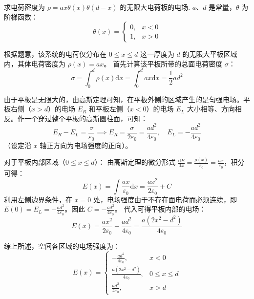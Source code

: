 \begin{exercise}\label{ex:15.10}
求电荷密度为 $\rho = ax\theta(x)\theta(d-x)$ 的无限大电荷板的电场. $a$、$d$ 是常量，$\theta$ 为阶梯函数：
$$ \theta(x) = \begin{cases} 0, & x < 0 \\ 1, & x > 0 \end{cases} $$
\end{exercise}
\begin{solution}
根据题意，该系统的电荷仅分布在 $0 \le x \le d$ 这一厚度为 $d$ 的无限大平板区域内，其体电荷密度为 $\rho(x) = ax$。
首先计算该平板所带的总面电荷密度 $\sigma$：
$$ \sigma = \int_0^d \rho(x) \mathrm{d}x = \int_0^d ax \mathrm{d}x = \frac{1}{2}ad^2 $$

由于平板是无限大的，由高斯定理可知，在平板外侧的区域产生的是匀强电场。平板右侧（$x > d$）的电场 $E_R$ 和平板左侧（$x < 0$）的电场 $E_L$ 大小相等、方向相反。作一个穿过整个平板的高斯圆柱面，可知：
$$ E_R - E_L = \frac{\sigma}{\varepsilon_0} \implies E_R = \frac{\sigma}{2\varepsilon_0} = \frac{ad^2}{4\varepsilon_0}, \quad E_L = -\frac{ad^2}{4\varepsilon_0} $$
（设定沿 $x$ 轴正方向为电场强度的正向）。

对于平板内部区域（$0 \le x \le d$）：
由高斯定理的微分形式 $\frac{\mathrm{d}E}{\mathrm{d}x} = \frac{\rho(x)}{\varepsilon_0} = \frac{ax}{\varepsilon_0}$，积分可得：
$$ E(x) = \int \frac{ax}{\varepsilon_0} \mathrm{d}x = \frac{ax^2}{2\varepsilon_0} + C $$
利用左侧边界条件，在 $x=0$ 处，电场强度由于不存在面电荷而必须连续，即 $E(0) = E_L = -\frac{ad^2}{4\varepsilon_0}$。因此 $C = -\frac{ad^2}{4\varepsilon_0}$。
代入可得平板内部的电场：
$$ E(x) = \frac{ax^2}{2\varepsilon_0} - \frac{ad^2}{4\varepsilon_0} = \frac{a(2x^2 - d^2)}{4\varepsilon_0} $$

综上所述，空间各区域的电场强度为：
$$ E(x) = \begin{cases} 
-\frac{ad^2}{4\varepsilon_0}, & x < 0 \\ 
\frac{a(2x^2 - d^2)}{4\varepsilon_0}, & 0 \le x \le d \\ 
\frac{ad^2}{4\varepsilon_0}, & x > d 
\end{cases} $$
\end{solution}

